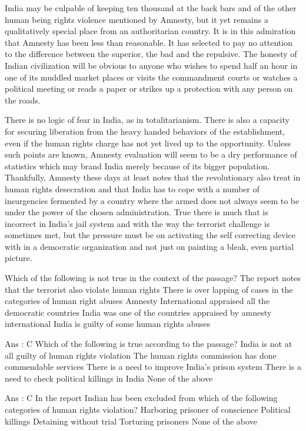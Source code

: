     India may be culpable of keeping ten thousand at the back bars and of the other human being rights violence mentioned by Amnesty, but it yet remains a qualitatively special place from an authoritarian country. It is in this admiration that Amnesty has been less than reasonable. It has selected to pay no attention to the difference between the superior, the bad and the repulsive. The honesty of Indian civilization will be obvious to anyone who wishes to spend half an hour in one of its muddled market places or visits the commandment courts or watches a political meeting or reads a paper or strikes up a protection with any person on the roads.

    There is no logic of fear in India, as in totalitarianism. There is also a capacity for securing liberation from the heavy handed behaviors of the establishment, even if the human rights charge has not yet lived up to the opportunity. Unless such points are known, Amnesty evaluation will seem to be a dry performance of statistics which may brand India merely because of its bigger population. Thankfully, Amnesty these days at least notes that the revolutionary also treat in human rights desecration and that India has to cope with a number of insurgencies fermented by a country where the armed does not always seem to be under the power of the chosen administration. True there is much that is incorrect in India’s jail system and with the way the terrorist challenge is sometimes met, but the pressure must be on activating the self correcting device with in a democratic organization and not just on painting a bleak, even partial picture.

        Which of the following is not true in the context of the passage?
            The report notes that the terrorist also violate human rights
            There is over lapping of cases in the categories of human right abuses
            Amnesty International appraised all the democratic countries
            India was one of the countries appraised by amnesty international
            India is guilty of some human rights abuses 

        Ans : C
        Which of the following is true according to the passage?
            India is not at all guilty of human rights violation
            The human rights commission has done commendable services
            There is a need to improve India’s prison system
            There is a need to check political killings in India
            None of the above 

        Ans : C
        In the report Indian has been excluded from which of the following categories of human rights violation?
            Harboring prisoner of conscience
            Political killings
            Detaining without trial
            Torturing prisoners
            None of the above 

